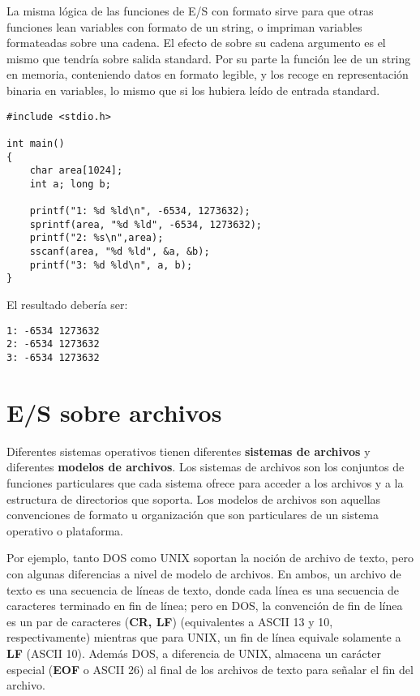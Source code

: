 La misma lógica de las funciones de E/S con formato sirve para que otras
funciones lean variables con formato de un string, o impriman variables
formateadas sobre una cadena. El efecto de  sobre su cadena argumento
es el mismo que tendría  sobre salida standard. Por su parte la función 
 lee de un string en memoria, conteniendo datos en formato legible, y los
recoge en representación binaria en variables, lo mismo que si  los
hubiera leído de entrada standard.

\begin{ejemplo}
\begin{lstlisting}
#include <stdio.h>

int main()
{
    char area[1024];
    int a; long b;
    
	printf("1: %d %ld\n", -6534, 1273632);
    sprintf(area, "%d %ld", -6534, 1273632);
	printf("2: %s\n",area);
    sscanf(area, "%d %ld", &a, &b);
    printf("3: %d %ld\n", a, b);
}
\end{lstlisting}

El resultado debería ser:
\begin{lstlisting}
1: -6534 1273632
2: -6534 1273632
3: -6534 1273632
\end{lstlisting}
\end{ejemplo}

\chapter{E/S sobre archivos}
\label{sec:esarchivos}

Diferentes sistemas operativos tienen diferentes \textbf{sistemas de archivos} y
diferentes \textbf{modelos de archivos}. Los sistemas de archivos son los conjuntos de
funciones particulares que cada sistema ofrece para acceder a los archivos y a
la estructura de directorios que soporta. Los modelos de archivos son aquellas
convenciones de formato u organización que son particulares de un sistema
operativo o plataforma.

Por ejemplo, tanto DOS como UNIX soportan la noción de archivo de texto, pero
con algunas diferencias a nivel de modelo de archivos. En ambos, un archivo de
texto es una secuencia de líneas de texto, donde cada línea es una secuencia de
caracteres terminado en fin de línea; pero en DOS, la convención de fin de
línea es un par de caracteres (\textbf{CR, LF}) (equivalentes a ASCII 13 y 10, respectivamente) mientras
que para UNIX, un fin de línea equivale solamente a \textbf{LF} (ASCII 10). Además DOS, a diferencia de UNIX,
almacena un carácter especial (\textbf{EOF} o ASCII 26) al final de los archivos 
de texto para señalar el fin del archivo.



